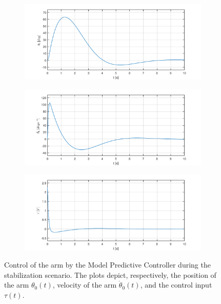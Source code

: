 \begin{figure}[H]
	\centering
	\begin{subfigure}
		\centering
		\includegraphics[scale=0.6]{images/MPC/arm.pdf}  
	\end{subfigure}
	\begin{subfigure}
		\centering
		\includegraphics[scale=0.6]{images/MPC/darm.pdf}  
	\end{subfigure}
	\begin{subfigure}
		\centering
		\includegraphics[scale=0.6]{images/MPC/control.pdf}  
	\end{subfigure}
	\caption{Control of the arm by the Model Predictive Controller during the stabilization scenario. The plots depict, respectively, the position of the arm $\theta_0(t)$, velocity of the arm $\dot{\theta}_0(t)$, and the control input $\tau(t)$.}
	\label{mpc}
\end{figure}
